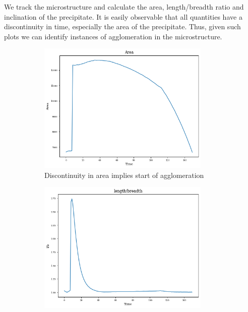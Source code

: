\documentclass[12pt, a4paper]{report}
\begin{document}
We track the microstructure and calculate the area, length/breadth ratio and inclination of the precipitate. It is easily observable that all quantities have a discontinuity in time, especially the area of the precipitate. Thus, given such plots we can identify instances of agglomeration in the microstructure. 

\begin{figure}[H]
\centering
  \begin{subfigure}{.45\textwidth}
  \centering
  \includegraphics[width=0.9\textwidth]{Pictures/Results/2area.jpeg}
  \caption{Discontinuity in area implies start of agglomeration}
  \label{img:microstrImg}
  \end{subfigure}
  \begin{subfigure}{.45\textwidth}
  \centering
  \includegraphics[width=0.9\textwidth]{Pictures/Results/2lb.png}

\end{subfigure}
\end{figure}
\end{document}
